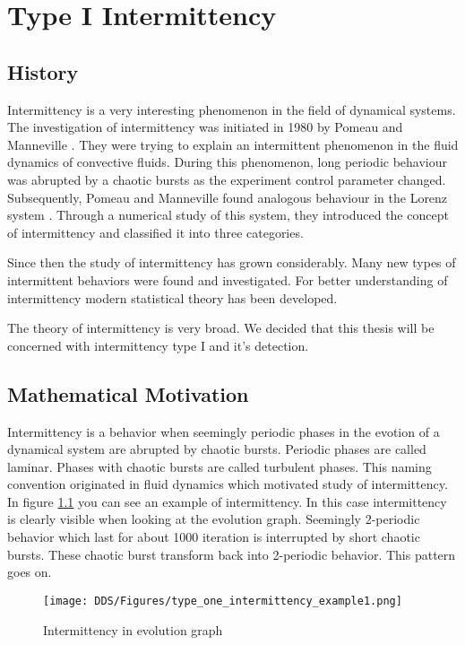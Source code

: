 \chapter{Type I Intermittency}
\label{chap:intermittency_review}

\section{History}
Intermittency is a very interesting phenomenon in the field of dynamical systems.
The investigation of intermittency was initiated in 1980 by Pomeau and Manneville \cite{Pomeau1980}.
They were trying to explain an intermittent phenomenon in the fluid dynamics of convective fluids.
During this phenomenon, long periodic behaviour was abrupted by a chaotic bursts as the experiment control parameter changed.
Subsequently, Pomeau and Manneville found analogous behaviour in the Lorenz system \cite{Lorenz2004}.
Through a numerical study of this system, they introduced the concept of intermittency and classified it into three categories. \cite{Pomeau1980}
\par
Since then the study of intermittency has grown considerably.
Many new types of intermittent behaviors were found and investigated.
For better understanding of intermittency modern statistical theory has been developed.
\cite{Elaskar2017}
\par
The theory of intermittency is very broad.
We decided that this thesis will be concerned with intermittency type I and it's detection.

\section{Mathematical Motivation}
Intermittency is a behavior when seemingly periodic phases in the evotion of a dynamical system are abrupted by chaotic bursts.
Periodic phases are called laminar.
Phases with chaotic bursts are called turbulent phases.
This naming convention originated in fluid dynamics which motivated study of intermittency. \cite{Pomeau1980}
\\
In figure \ref{fig:intermittent_evolution_example} you can see an example of intermittency.
In this case intermittency is clearly visible when looking at the evolution graph.
Seemingly 2-periodic behavior which last for about 1000 iteration is interrupted by short chaotic bursts.
These chaotic burst transform back into 2-periodic behavior.
This pattern goes on.

\begin{figure}[!h]
    \centering
    \texttt{[image: DDS/Figures/type\_one\_intermittency\_example1.png]}
    \caption{Intermittency in evolution graph}
    \label{fig:intermittent_evolution_example}
\end{figure}

